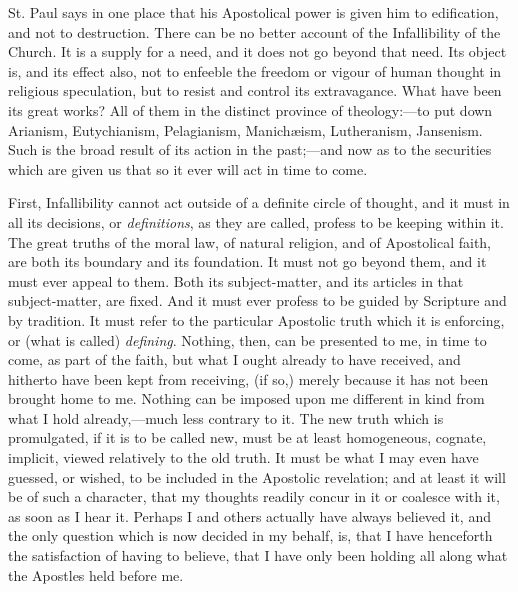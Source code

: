 St. Paul says in one place that his Apostolical power is given him to
edification, and not to destruction. There can be no better account of
the Infallibility of the Church. It is a supply for a need, and it does
not go beyond that need. Its object is, and its effect also, not to
enfeeble the freedom or vigour of human thought in religious
speculation, but to resist and control its extravagance. What have been
its great works? All of them in the distinct province of theology:—to
put down Arianism, Eutychianism, Pelagianism, Manichæism, Lutheranism,
Jansenism. Such is the broad result of its action in the past;—and now
as to the securities which are given us that so it ever will act in time
to come.

First, Infallibility cannot act outside of a definite circle of
thought, and it must in all its decisions, or \emph{definitions}, as
they are called, profess to be keeping within it. The great truths of
the moral law, of natural religion, and of Apostolical faith, are both
its boundary and its foundation. It must not go beyond them, and it must
ever appeal to them. Both its subject-matter, and its articles in that
subject-matter, are fixed. And it must ever profess to be
guided by Scripture and by tradition. It must refer to the particular
Apostolic truth which it is enforcing, or (what is called) \emph{defining}.
Nothing, then, can be presented to me, in time to come, as part of the
faith, but what I ought already to have received, and hitherto
have been kept from receiving, (if so,) merely because it has not
been brought home to me. Nothing can be imposed upon me different in kind
from what I hold already,—much less contrary to it. The new truth
which is promulgated, if it is to be called new, must be at least
homogeneous, cognate, implicit, viewed relatively to the old truth. It
must be what I may even have guessed, or wished, to be included in the
Apostolic revelation; and at least it will be of such a character, that
my thoughts readily concur in it or coalesce with it, as soon as I hear
it. Perhaps I and others actually have always believed it, and the only
question which is now decided in my behalf, is, that I have henceforth the satisfaction of having
to believe, that I have only been holding all
along what the Apostles held before me.

